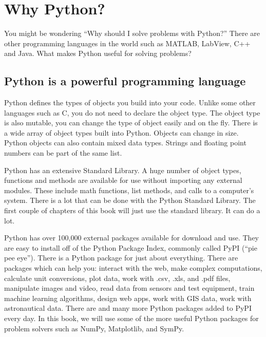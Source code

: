 \documentclass{book}
\begin{document}
    




    
        \hypertarget{why-python}{%
\section{Why Python?}\label{why-python}}
    




    
        You might be wondering ``Why should I solve problems with Python?''
There are other programming languages in the world such as MATLAB,
LabView, C++ and Java. What makes Python useful for solving problems?
    




    
        \hypertarget{python-is-a-powerful-programming-language}{%
\subsection{Python is a powerful programming
language}\label{python-is-a-powerful-programming-language}}

Python defines the types of objects you build into your code. Unlike
some other languages such as C, you do not need to declare the object
type. The object type is also mutable, you can change the type of object
easily and on the fly. There is a wide array of object types built into
Python. Objects can change in size. Python objects can also contain
mixed data types. Strings and floating point numbers can be part of the
same list.

Python has an extensive Standard Library. A huge number of object types,
functions and methods are available for use without importing any
external modules. These include math functions, list methods, and calls
to a computer's system. There is a lot that can be done with the Python
Standard Library. The first couple of chapters of this book will just
use the standard library. It can do a lot.

Python has over 100,000 external packages available for download and
use. They are easy to install off of the Python Package Index, commonly
called PyPI (``pie pee eye''). There is a Python package for just about
everything. There are packages which can help you: interact with the
web, make complex computations, calculate unit conversions, plot data,
work with .csv, .xls, and .pdf files, manipulate images and video, read
data from sensors and test equipment, train machine learning algorithms,
design web apps, work with GIS data, work with astronautical data. There
are and many more Python packages added to PyPI every day. In this book,
we will use some of the more useful Python packages for problem solvers
such as NumPy, Matplotlib, and SymPy.
    
\end{document}
